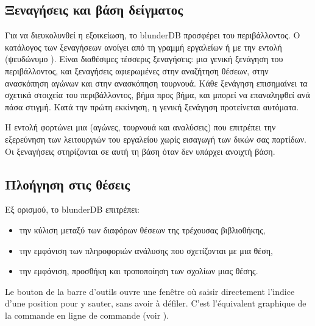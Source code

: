 \documentclass[letterpaper,10pt,greek]{sphinxmanual}
\begin{document}
\subsection{Ξεναγήσεις και βάση δείγματος}
\label{\detokenize{manuel:visites-guidees-et-base-d-exemple}}\label{\detokenize{manuel:visites-guidees}}
\sphinxAtStartPar
Για να διευκολυνθεί η εξοικείωση, το blunderDB προσφέρει  του περιβάλλοντος. Ο κατάλογος των ξεναγήσεων ανοίγει από τη γραμμή εργαλείων ή με την εντολή  (ψευδώνυμο ). Είναι διαθέσιμες τέσσερις ξεναγήσεις: μια γενική ξενάγηση του περιβάλλοντος, και ξεναγήσεις αφιερωμένες στην αναζήτηση θέσεων, στην ανασκόπηση αγώνων και στην ανασκόπηση τουρνουά. Κάθε ξενάγηση επισημαίνει τα σχετικά στοιχεία του περιβάλλοντος, βήμα προς βήμα, και μπορεί να επαναληφθεί ανά πάσα στιγμή. Κατά την πρώτη εκκίνηση, η γενική ξενάγηση προτείνεται αυτόματα.

\sphinxAtStartPar
Η εντολή  φορτώνει μια  (αγώνες, τουρνουά και αναλύσεις) που επιτρέπει την εξερεύνηση των λειτουργιών του εργαλείου χωρίς εισαγωγή των δικών σας παρτίδων. Οι ξεναγήσεις στηρίζονται σε αυτή τη βάση όταν δεν υπάρχει ανοιχτή βάση.


\subsection{Πλοήγηση στις θέσεις}
\label{\detokenize{manuel:navigation-dans-les-positions}}\label{\detokenize{manuel:navigation-positions}}
\sphinxAtStartPar
Εξ ορισμού, το blunderDB επιτρέπει:
\begin{itemize}
\item {} 
\sphinxAtStartPar
την κύλιση μεταξύ των διαφόρων θέσεων της τρέχουσας βιβλιοθήκης,

\item {} 
\sphinxAtStartPar
την εμφάνιση των πληροφοριών ανάλυσης που σχετίζονται με μια θέση,

\item {} 
\sphinxAtStartPar
την εμφάνιση, προσθήκη και τροποποίηση των σχολίων μιας θέσης.

\end{itemize}

\sphinxAtStartPar
Le bouton  de la barre d’outils ouvre une fenêtre où
saisir directement l’indice d’une position pour y sauter, sans avoir à
défiler. C’est l’équivalent graphique de la commande \sphinxcode{\sphinxupquote{{[}number{]}}} en ligne de
commande (voir {\hyperref[\detokenize{cmd_mode:cmd-positions}]{}}).
\end{document}

